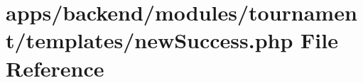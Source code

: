 \hypertarget{backend_2modules_2tournament_2templates_2new_success_8php}{\section{apps/backend/modules/tournament/templates/new\-Success.php File Reference}
\label{backend_2modules_2tournament_2templates_2new_success_8php}
}
